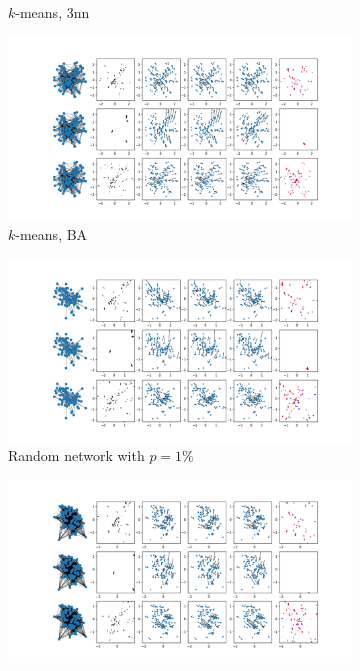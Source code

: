 \documentclass[a4paper,10pt]{article}
\begin{document}
\begin{figure}[htbp]
\begin{subfigure}{0.24\textwidth}
    \caption{$k$-means, 3nn}
  \end{subfigure}
  \begin{subfigure}{0.24\textwidth}
    \centering
    \includegraphics[trim={0 13.2cm 29cm 0},clip,width=\textwidth]{../results/ba-100N-noemb-fixed}
    \caption{$k$-means, BA}
  \end{subfigure}
  \begin{subfigure}{0.24\textwidth}
    \centering
    \includegraphics[trim={0 13.2cm 29cm 0},clip,width=\textwidth]{../results/rn1-100N-noemb0}
    \caption{Random network with $p=1\%$}
  \end{subfigure}
  \begin{subfigure}{0.24\textwidth}
    \centering
    \includegraphics[trim={0 13.2cm 29cm 0},clip,width=\textwidth]{../results/rn10-100N-noemb0}

\end{subfigure}
\end{figure}
\end{document}
